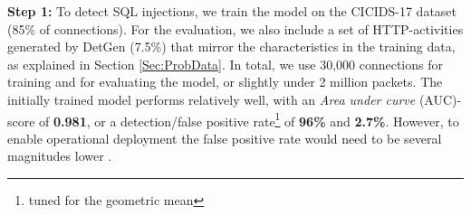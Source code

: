 \documentclass[runningheads]{llncs}
\begin{document}






\textbf{Step 1:} To detect SQL injections, we train the model on the CICIDS-17 dataset \cite{sharafaldin2018toward} (85\% of connections).
For the evaluation, we also include a set of HTTP-activities generated by DetGen (7.5\%) that mirror the characteristics in the training data, as explained in Section \ref{Sec:ProbData}. %
In total, we use 30,000 connections for training and for evaluating the model, or slightly under 2 million packets.
The initially trained model performs relatively well, with an \textit{Area under curve} (AUC)-score %
 of \textbf{0.981}, or a detection/false positive rate\footnote{tuned for the geometric mean} of \textbf{96\%} and \textbf{2.7\%}. However, to enable operational deployment the false positive rate would need to be several magnitudes lower \cite{mell2003overview}. 
\end{document}

